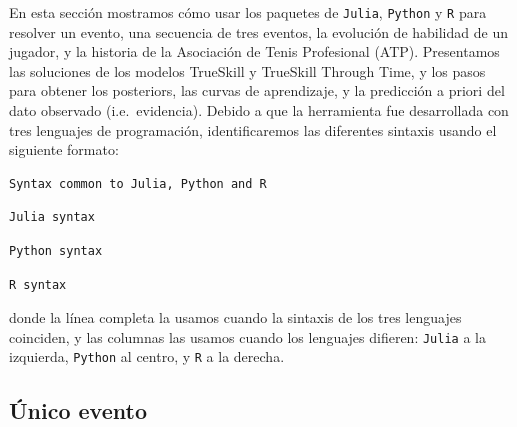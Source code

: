 \documentclass[a4paper,11pt]{book}
\theoremstyle{definition}
\begin{document}
En esta sección mostramos cómo usar los paquetes de \texttt{Julia}, \texttt{Python} y \texttt{R} para resolver un evento, una secuencia de tres eventos, la evolución de habilidad de un jugador, y la historia de la Asociación de Tenis Profesional (ATP).
%
Presentamos las soluciones de los modelos TrueSkill y TrueSkill Through Time, y los pasos para obtener los posteriors, las curvas de aprendizaje, y la predicción a priori del dato observado (i.e.~evidencia).
%
Debido a que la herramienta fue desarrollada con tres lenguajes de programación, identificaremos las diferentes sintaxis usando el siguiente formato:
%
\begin{lstlisting}[captionpos=b, backgroundcolor=\color{all}, belowskip=-0.77 \baselineskip,escapechar=|]
Syntax common to Julia, Python and R
\end{lstlisting}
\begin{paracol}{3}
\begin{lstlisting}[backgroundcolor=\color{julia!60}]
Julia syntax
\end{lstlisting}
  \switchcolumn
\begin{lstlisting}[backgroundcolor=\color{python!60}]
Python syntax
\end{lstlisting}
   \switchcolumn
\begin{lstlisting}[backgroundcolor=\color{r!50}]
R syntax
\end{lstlisting}
\end{paracol}
%
donde la línea completa la usamos cuando la sintaxis de los tres lenguajes coinciden, y las columnas las usamos cuando los lenguajes difieren: \texttt{Julia} a la izquierda, \texttt{Python} al centro, y \texttt{R} a la derecha.

\subsection{\'Unico evento} \label{sec:singleEvent}
\end{document}
